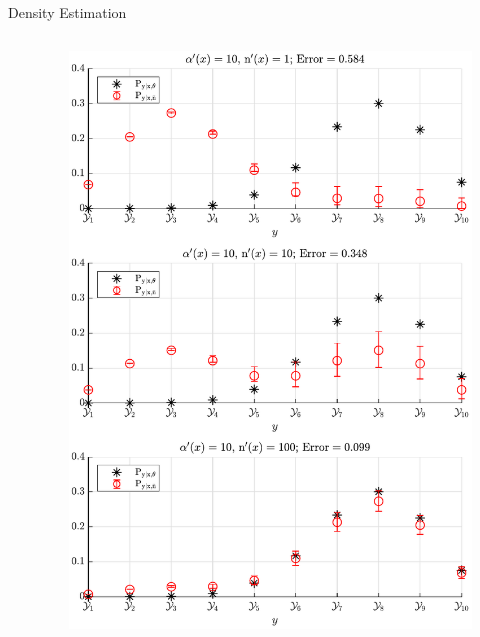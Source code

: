 \documentclass[final]{beamer}
\begin{document}
\begin{frame}{}
\begin{columns}[T]
\begin{column}{.34\linewidth}
\begin{block}{Density Estimation}
\begin{columns}[t]
\begin{column}{.5\linewidth}
\end{column}
\begin{column}{.5\linewidth}

\begin{figure}
\centering
\includegraphics[width=0.9\linewidth]{P_yx_error_a0_10.pdf}
\end{figure}

\end{column}
\end{columns}



\end{block}  
    
\end{column}




\end{columns}


\end{frame}
\end{document}
